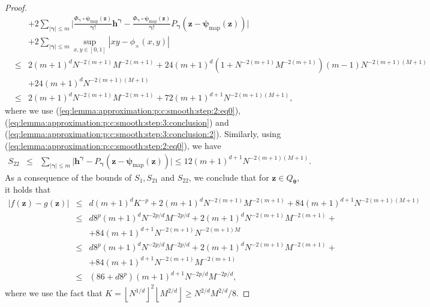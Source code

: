 \documentclass[11pt, preprint]{imsart}
\numberwithin{equation}{section}
\def \bfgamma{\bm{\gamma}}
\def \bfz{\mathbf{z}}
\def \bfh{\mathbf{h}}
\def \bftheta{\bm{\theta}}
\newcommand{\floor}[1]{\left\lfloor #1 \right\rfloor}
\theoremstyle{plain}
\theoremstyle{definition}
\begin{document}
\begin{proof}
\begin{eqnarray}
	&&+2\sum_{|\bfgamma|\leq m}\bigg|\frac{\Phi_{\bfgamma}\circ \bm{\psi}_{\textrm{map}}(\bfz)}{\bfgamma !}\bfh^{\bfgamma}-\frac{\Phi_{\bfgamma}\circ \bm{\psi}_{\textrm{map}}(\bfz)}{\bfgamma !} P_{\bfgamma}(\bfz- \bm{\psi}_{\textrm{map}}(\bfz))\bigg|\nonumber\\ 
	&&+2\sum_{|\bfgamma|\leq m}\sup_{x,y \in [0, 1]}|xy-\phi_{\times}(x,y)|\nonumber\\ 
	&\leq& 2(m+1)^dN^{-2(m+1)}M^{-2(m+1)}+24(m+1)^d(1+N^{-2(m+1)}M^{-2(m+1)})(m-1)N^{-2(m+1)(M+1)}\nonumber\\
	&&+24(m+1)^dN^{-2(m+1)(M+1)}\nonumber\\
	&\leq&2(m+1)^dN^{-2(m+1)}M^{-2(m+1)}+72(m+1)^{d+1}N^{-2(m+1)(M+1)},\nonumber
\end{eqnarray}
where we use (\ref{eq:lemma:approximation:p:c:smooth:step:2:eq0}), (\ref{eq:lemma:approximation:p:c:smooth:step:3:conclusion}) and (\ref{eq:lemma:approximation:p:c:smooth:step:3:conclusion:2}). Similarly, using (\ref{eq:lemma:approximation:p:c:smooth:step:2:eq0}), we have
\begin{eqnarray}
	S_{22}&\leq&\sum_{|\bfgamma|\leq m}\bigg|\bfh^{\bfgamma}-P_{\bfgamma}(\bfz- \bm{\psi}_{\textrm{map}}(\bfz))\bigg|\leq 12(m+1)^{d+1}N^{-2(m+1)(M+1)}\nonumber.
\end{eqnarray}
As a consequence of the bounds of $S_1, S_{21}$ and $S_{22}$, we conclude that for $\bfz \in Q_{\bftheta}$, it holds that
\begin{eqnarray}
	|f(\bfz)-g(\bfz)|&\leq&  d(m+1)^dK^{-p}+2(m+1)^dN^{-2(m+1)}M^{-2(m+1)}+84(m+1)^{d+1}N^{-2(m+1)(M+1)}\nonumber\\
	&\leq& d8^p(m+1)^dN^{-2p/d}M^{-2p/d}+2(m+1)^dN^{-2(m+1)}M^{-2(m+1)}+\nonumber\\
	&&+84(m+1)^{d+1}N^{-2(m+1)}N^{-2(m+1)M}\nonumber\\
	&\leq&d8^p(m+1)^dN^{-2p/d}M^{-2p/d}+2(m+1)^dN^{-2(m+1)}M^{-2(m+1)}+\nonumber\\
	&&+84(m+1)^{d+1}N^{-2(m+1)}M^{-2(m+1)}\nonumber\\
	&\leq& (86+d8^p)(m+1)^{d+1}N^{-2p/d}M^{-2p/d},\nonumber
\end{eqnarray}
where we use the fact that $K=\floor{N^{1/d}}^2\floor{M^{2/d}}\geq N^{2/d}M^{2/d}/8$.


\end{proof}
\end{document}
